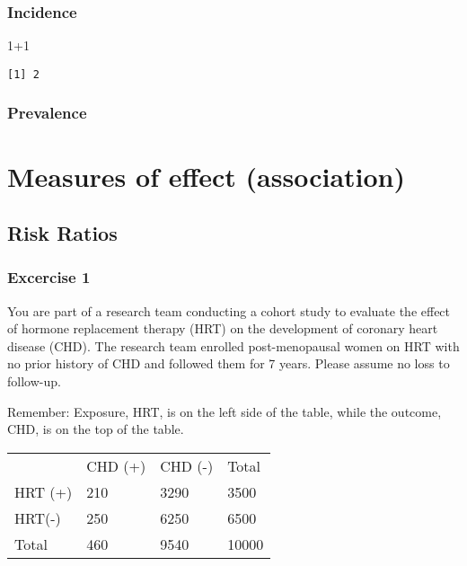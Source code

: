 \documentclass[
  letterpaper,
  paper=6in:9in,
  pagesize=pdftex,
  headinclude=on,
  footinclude=on,
  12pt]{scrbook}
\newenvironment{Shaded}{\begin{snugshade}}{\end{snugshade}}
\newcommand{\DecValTok}[1]{\textcolor[rgb]{0.68,0.00,0.00}{#1}}
\newcommand{\SpecialCharTok}[1]{\textcolor[rgb]{0.37,0.37,0.37}{#1}}
\begin{document}
\hypertarget{incidence}{%
\subsection{Incidence}\label{incidence}}

\begin{Shaded}
\begin{Highlighting}[]
\DecValTok{1}\SpecialCharTok{+}\DecValTok{1}
\end{Highlighting}
\end{Shaded}

\begin{verbatim}
[1] 2
\end{verbatim}

\hypertarget{prevalence}{%
\subsection{Prevalence}\label{prevalence}}


\hypertarget{sec-measure-of-effect}{%
\chapter{Measures of effect (association)}\label{sec-measure-of-effect}}

\hypertarget{risk-ratios}{%
\section{Risk Ratios}\label{risk-ratios}}

\hypertarget{excercise-1}{%
\subsection{Excercise 1}\label{excercise-1}}

You are part of a research team conducting a cohort study to evaluate
the effect of hormone replacement therapy (HRT) on the development of
coronary heart disease (CHD). The research team enrolled post-menopausal
women on HRT with no prior history of CHD and followed them for 7 years.
Please assume no loss to follow-up.

Remember: Exposure, HRT, is on the left side of the table, while the
outcome, CHD, is on the top of the table.

\begin{longtable}[]{@{}llll@{}}
\toprule\noalign{}
\endhead
\bottomrule\noalign{}
\endlastfoot
& CHD (+) & CHD (-) & Total \\
HRT (+) & 210 & 3290 & 3500 \\
HRT(-) & 250 & 6250 & 6500 \\
Total & 460 & 9540 & 10000 \\
\end{longtable}
\end{document}
